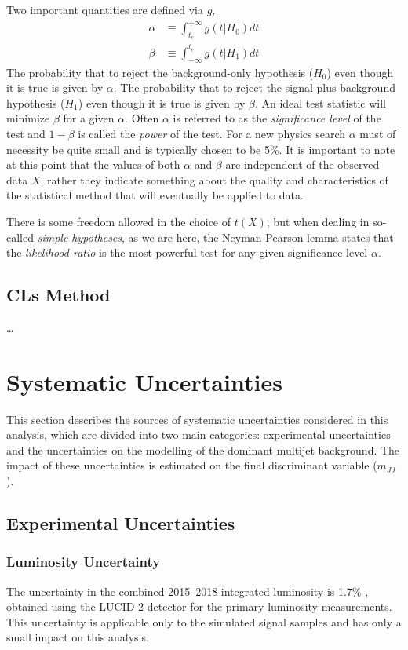 Two important quantities are defined via $g$,
\begin{align}
    \alpha &\equiv \int_{t_c}^{+ \infty} g(t|H_0)dt \\
    \beta &\equiv \int_{-\infty}^{t_c} g(t|H_1)dt
\end{align}
The probability that to reject the background-only hypothesis ($H_0$) even though it is true is given by $\alpha$.
The probability that to reject the signal-plus-background hypothesis ($H_1$) even though it is true is given by $\beta$.
An ideal test statistic will minimize $\beta$ for a given $\alpha$.
Often $\alpha$ is referred to as the \textit{significance level} of the test and $1-\beta$ is called the \textit{power} of the test.
For a new physics search $\alpha$ must of necessity be quite small and is typically chosen to be 5\%.
It is important to note at this point that the values of both $\alpha$ and $\beta$ are independent of the observed data $X$, rather they indicate something about the quality and characteristics of the statistical method that will eventually be applied to data.

There is some freedom allowed in the choice of $t(X)$, but when dealing in so-called \textit{simple hypotheses}, as we are here, the Neyman-Pearson lemma states that the \textit{likelihood ratio} is the most powerful test for any given significance level $\alpha$.

\subsection{CLs Method}
\dots

\section{Systematic Uncertainties}
\label{sec:syst}

This section describes the sources of systematic uncertainties considered in this analysis, which are divided into two main categories: experimental uncertainties and the uncertainties on the modelling of the dominant multijet background. The impact of these uncertainties is estimated on the final discriminant variable ($m_{JJ}$).

\subsection{Experimental Uncertainties}
\label{sec:syst-exp}
%
\subsubsection{Luminosity Uncertainty}
The uncertainty in the combined 2015--2018 integrated luminosity is 1.7\% \cite{ATLAS-CONF-2019-021}, obtained using the LUCID-2 detector \cite{LUCID2} for the primary luminosity measurements.
This uncertainty is applicable only to the simulated signal samples and has only a small impact on this analysis.

